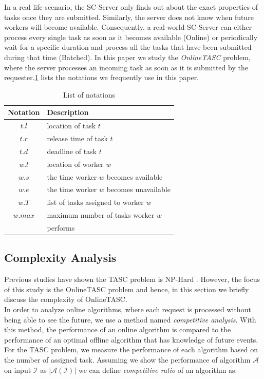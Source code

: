 In a real life scenario, the SC-Server only finds out about the exact properties of tasks once they are submitted. Similarly, the server does not know when future workers will become available. Consequently, a real-world SC-Server can either process every single task as soon as it becomes available (Online) or periodically wait for a specific duration and process all the tasks that have been submitted during that time (Batched). In this paper we study the \textit{OnlineTASC} problem, where the server processes an incoming task as soon as it is submitted by the requester.\cref{tab:notation} lists the notations we frequently use in this paper.\\

\begin{table}
\begin{center}
\begin{tabular}{| c | l |} \hline
Notation	&	Description \\ \hline
$t.l$		&	location of task $t$ \\ \hline
$t.r$		&	release time of task $t$ \\ \hline
$t.d$		& 	deadline of task $t$ \\ \hline
$w.l$		&	location of worker $w$ \\ \hline
$w.s$		&	the time worker $w$ becomes available \\ \hline
$w.e$		&	the time worker $w$ becomes unavailable \\ \hline
$w.T$		&	list of tasks assigned to worker $w$ \\ \hline
$w.max$		&	maximum number of tasks worker $w$ \\
			&	performs \\ \hline
\end{tabular}
\caption{List of notations}
\label{tab:notation}
\end{center}
\end{table}

\subsection{Complexity Analysis}

Previous studies have shown the TASC problem is NP-Hard \cite{Kazemi13, Deng15}. However, the focus of this study is the OnlineTASC problem and hence, in this section we briefly discuss the complexity of OnlineTASC.\\

In order to analyze online algorithms, where each request is processed without being able to see the future, we use a method named \textit{competitive analysis}\cite{Sleator85}. With this method, the performance of an online algorithm is compared to the performance of an optimal offline algorithm that has knowledge of future events. For the TASC problem, we measure the performance of each algorithm based on the number of assigned task. Assuming we show the performance of algorithm $\mathcal{A}$ on input $\mathcal{I}$ as $\vert \mathcal{A}\left( \mathcal{I} \right) \vert$ we can define \textit{competitive ratio} of an algorithm as:

